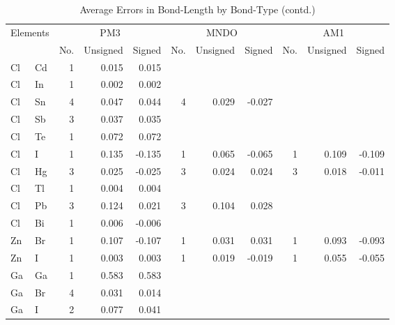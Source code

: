 \begin{table}
\caption{\label{avegeosd} Average Errors in Bond-Length by Bond-Type (contd.)} 
\compresstable
\begin{center}
\begin{tabular}{llrrrrrrrrr}
\multicolumn{2}{c}{Elements} & \multicolumn{3}{c}{PM3} &
\multicolumn{3}{c}{MNDO} & \multicolumn{3}{c}{AM1} \\
 & &  No. & Unsigned & Signed & No. & Unsigned & Signed & No. & Unsigned & Signed \\ \hline
 Cl &  Cd &   1 &    0.015 &    0.015 &     &          &          &     &          &          \\
 Cl &  In &   1 &    0.002 &    0.002 &     &          &          &     &          &          \\
 Cl &  Sn &   4 &    0.047 &    0.044 &   4 &    0.029 &   -0.027 &     &          &          \\
 Cl &  Sb &   3 &    0.037 &    0.035 &     &          &          &     &          &          \\
 Cl &  Te &   1 &    0.072 &    0.072 &     &          &          &     &          &          \\
 Cl &   I &   1 &    0.135 &   -0.135 &   1 &    0.065 &   -0.065 &   1 &    0.109 &   -0.109 \\
 Cl &  Hg &   3 &    0.025 &   -0.025 &   3 &    0.024 &    0.024 &   3 &    0.018 &   -0.011 \\
 Cl &  Tl &   1 &    0.004 &    0.004 &     &          &          &     &          &          \\
 Cl &  Pb &   3 &    0.124 &    0.021 &   3 &    0.104 &    0.028 &     &          &          \\
 Cl &  Bi &   1 &    0.006 &   -0.006 &     &          &          &     &          &          \\
 Zn &  Br &   1 &    0.107 &   -0.107 &   1 &    0.031 &    0.031 &   1 &    0.093 &   -0.093 \\
 Zn &   I &   1 &    0.003 &    0.003 &   1 &    0.019 &   -0.019 &   1 &    0.055 &   -0.055 \\
 Ga &  Ga &   1 &    0.583 &    0.583 &     &          &          &     &          &          \\
 Ga &  Br &   4 &    0.031 &    0.014 &     &          &          &     &          &          \\
 Ga &   I &   2 &    0.077 &    0.041 &     &          &          &     &          &          \\

\end{tabular}
\end{center}
\end{table}

